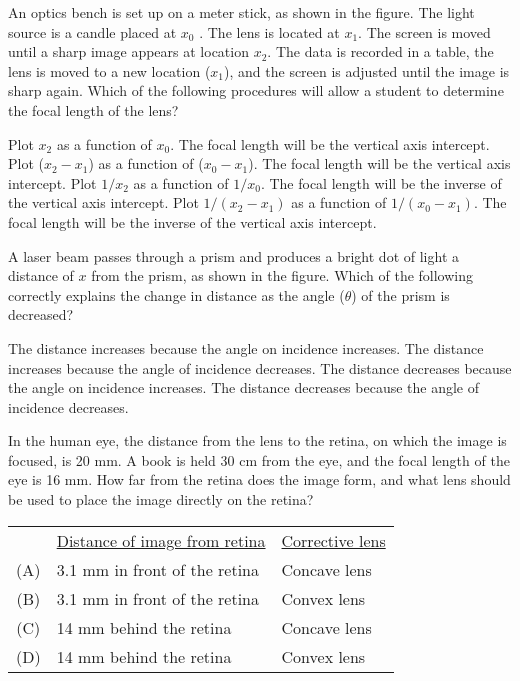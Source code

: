 \documentclass{../../../oss-ap12ibhl-print}
\begin{document}
\begin{questions}
  \question An optics bench is set up on a meter stick, as shown in the figure.
  The light source is a candle placed at $x_0$ . The lens is located at $x_1$.
  The screen is moved until a sharp image appears at location $x_2$. The data is
  recorded in a table, the lens is moved to a new location ($x_1$), and the
  screen is adjusted until the image is sharp again. Which of the following
  procedures will allow a student to determine the focal length of the lens?
  \begin{choices}
    \choice Plot $x_2$ as a function of $x_0$. The focal length will be the
    vertical axis intercept.
    \choice Plot ($x_2-x_1$) as a function of ($x_0-x_1$). The focal length will
    be the vertical axis intercept.
    \choice Plot $1/x_2$ as a function of $1/x_0$. The focal length will be the
    inverse of the vertical axis intercept.
    \choice Plot $1/(x_2-x_1)$ as a function of $1/(x_0-x_1)$. The focal length
    will be the inverse of the vertical axis intercept.
  \end{choices}
  \newpage
  
  \question A laser beam passes through a prism and produces a bright dot of
  light a distance of $x$ from the prism, as shown in the figure. Which of the
  following correctly explains the change in distance as the angle
  ($\theta$) of the prism is decreased?
  \begin{choices}
    \choice The distance increases because the angle on incidence increases.
    \choice The distance increases because the angle of incidence decreases.
    \choice The distance decreases because the angle on incidence increases.
    \choice The distance decreases because the angle of incidence decreases.
  \end{choices}

  \question In the human eye, the distance from the lens to the retina, on
  which the image is focused, is 20 mm. A book is held 30 cm from the eye, and
  the focal length of the eye is 16 mm. How far from the retina does the
  image form, and what lens should be used to place the image directly
  on the retina?
   
  \begin{tabular}{cll}
    & \underline{Distance of image from retina}
    & \underline{Corrective lens} \\
    (A) & 3.1 mm in front of the retina & Concave lens \\
    (B) & 3.1 mm in front of the retina & Convex lens \\
    (C) & 14 mm behind the retina & Concave lens \\
    (D) & 14 mm behind the retina & Convex lens
  \end{tabular}
  \newpage
  

\end{questions}
\end{document}
